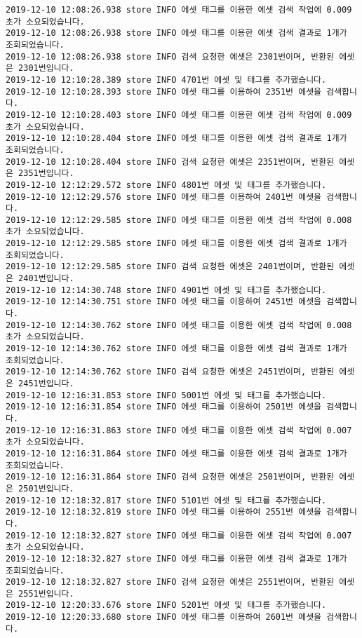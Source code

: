 \begin{Verbatim}[fontsize=\tiny, breaklines=true, breakanywhere=true]
2019-12-10 12:08:26.938 store INFO 에셋 태그를 이용한 에셋 검색 작업에 0.009초가 소요되었습니다.
2019-12-10 12:08:26.938 store INFO 에셋 태그를 이용한 에셋 검색 결과로 1개가 조회되었습니다.
2019-12-10 12:08:26.938 store INFO 검색 요청한 에셋은 2301번이며, 반환된 에셋은 2301번입니다.
2019-12-10 12:10:28.389 store INFO 4701번 에셋 및 태그를 추가했습니다.
2019-12-10 12:10:28.393 store INFO 에셋 태그를 이용하여 2351번 에셋을 검색합니다.
2019-12-10 12:10:28.403 store INFO 에셋 태그를 이용한 에셋 검색 작업에 0.009초가 소요되었습니다.
2019-12-10 12:10:28.404 store INFO 에셋 태그를 이용한 에셋 검색 결과로 1개가 조회되었습니다.
2019-12-10 12:10:28.404 store INFO 검색 요청한 에셋은 2351번이며, 반환된 에셋은 2351번입니다.
2019-12-10 12:12:29.572 store INFO 4801번 에셋 및 태그를 추가했습니다.
2019-12-10 12:12:29.576 store INFO 에셋 태그를 이용하여 2401번 에셋을 검색합니다.
2019-12-10 12:12:29.585 store INFO 에셋 태그를 이용한 에셋 검색 작업에 0.008초가 소요되었습니다.
2019-12-10 12:12:29.585 store INFO 에셋 태그를 이용한 에셋 검색 결과로 1개가 조회되었습니다.
2019-12-10 12:12:29.585 store INFO 검색 요청한 에셋은 2401번이며, 반환된 에셋은 2401번입니다.
2019-12-10 12:14:30.748 store INFO 4901번 에셋 및 태그를 추가했습니다.
2019-12-10 12:14:30.751 store INFO 에셋 태그를 이용하여 2451번 에셋을 검색합니다.
2019-12-10 12:14:30.762 store INFO 에셋 태그를 이용한 에셋 검색 작업에 0.008초가 소요되었습니다.
2019-12-10 12:14:30.762 store INFO 에셋 태그를 이용한 에셋 검색 결과로 1개가 조회되었습니다.
2019-12-10 12:14:30.762 store INFO 검색 요청한 에셋은 2451번이며, 반환된 에셋은 2451번입니다.
2019-12-10 12:16:31.853 store INFO 5001번 에셋 및 태그를 추가했습니다.
2019-12-10 12:16:31.854 store INFO 에셋 태그를 이용하여 2501번 에셋을 검색합니다.
2019-12-10 12:16:31.863 store INFO 에셋 태그를 이용한 에셋 검색 작업에 0.007초가 소요되었습니다.
2019-12-10 12:16:31.864 store INFO 에셋 태그를 이용한 에셋 검색 결과로 1개가 조회되었습니다.
2019-12-10 12:16:31.864 store INFO 검색 요청한 에셋은 2501번이며, 반환된 에셋은 2501번입니다.
2019-12-10 12:18:32.817 store INFO 5101번 에셋 및 태그를 추가했습니다.
2019-12-10 12:18:32.819 store INFO 에셋 태그를 이용하여 2551번 에셋을 검색합니다.
2019-12-10 12:18:32.827 store INFO 에셋 태그를 이용한 에셋 검색 작업에 0.007초가 소요되었습니다.
2019-12-10 12:18:32.827 store INFO 에셋 태그를 이용한 에셋 검색 결과로 1개가 조회되었습니다.
2019-12-10 12:18:32.827 store INFO 검색 요청한 에셋은 2551번이며, 반환된 에셋은 2551번입니다.
2019-12-10 12:20:33.676 store INFO 5201번 에셋 및 태그를 추가했습니다.
2019-12-10 12:20:33.680 store INFO 에셋 태그를 이용하여 2601번 에셋을 검색합니다.

\end{Verbatim}
